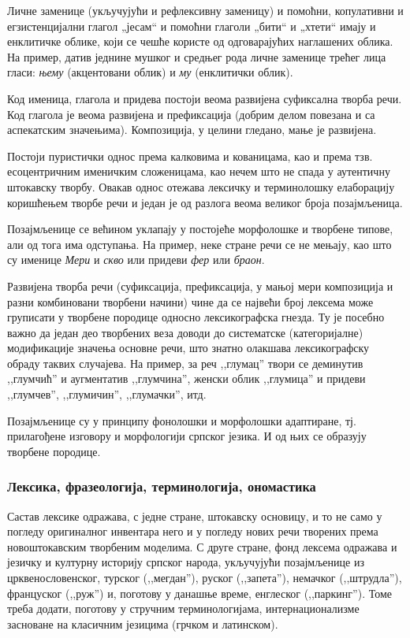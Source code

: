 {\begin{multicols}{2}
Личне заменице (укључујући и рефлексивну заменицу) и помоћни, копулативни и егзистенцијални глагол „јесам“ и помоћни глаголи „бити“ и „хтети“ имају и енклитичке облике, који се чешће користе од одговарајућих наглашених облика. На пример, датив једнине мушког и средњег рода личне заменице трећег лица гласи: \textit{њему} (акцентовани облик) и \textit{му} (енклитички облик).

Код именица, глагола и придева постоји веома развијена суфиксална творба речи. Код глагола је веома развијена и префиксација (добрим делом повезана и са аспекатским значењима). Композиција, у целини гледано, мање је развијена. 

Постоји пуристички однос према калковима и кованицама, као и према тзв. есоцентричним именичким сложеницама, као нечем што не спада у аутентичну  штокавску творбу. Овакав однос отежава лексичку и терминолошку елаборацију коришћењем творбе речи и један је од разлога веома великог броја позајмљеница.

Позајмљенице се већином уклапају у постојеће морфолошке и творбене типове, али од тога има одступања. На пример, неке стране речи се не мењају, као што су именице \textit{Мери} и \textit{скво} или придеви \textit{фер} или \textit{браон}. 

Развијена творба речи (суфиксација, префиксација, у мањој мери композиција и разни комбиновани творбени начини) чине да се највећи број лексема може груписати у творбене породице односно лексикографска гнезда. Ту је посебно важно да један део творбених веза доводи до систематске (категоријалне) модификације значења основне речи,  што знатно олакшава лексикографску обраду таквих случајева. На пример, за реч ,,глумац'' твори се деминутив ,,глумчић'' и аугментатив ,,глумчина'', женски облик ,,глумица'' и придеви ,,глумчев'', ,,глумичин'', ,,глумачки'', итд. 

Позајмљенице су у принципу фонолошки и морфолошки адаптиране, тј. прилагођене изговору и морфологији српског језика. И од њих се образују творбене породице.


\subsubsection {Лексика, фразеологија, терминологија, ономастика}
  
Састав лексике одражава, с једне стране,  штокавску основицу, и то не само у погледу оригиналног инвентара него и у погледу нових речи творених према новоштокавским творбеним моделима. С друге стране, фонд лексема одражава и језичку и културну историју српског народа, укључујући позајмљенице из црквенословенског, турског (,,мегдан''), руског (,,запета''), немачког (,,штрудла''), француског (,,руж'') и, поготову у данашње време, енглеског (,,паркинг''). Томе треба додати, поготову у стручним терминологијама, интернационализме засноване на класичним језицима (грчком и латинском).


\end{multicols}}
